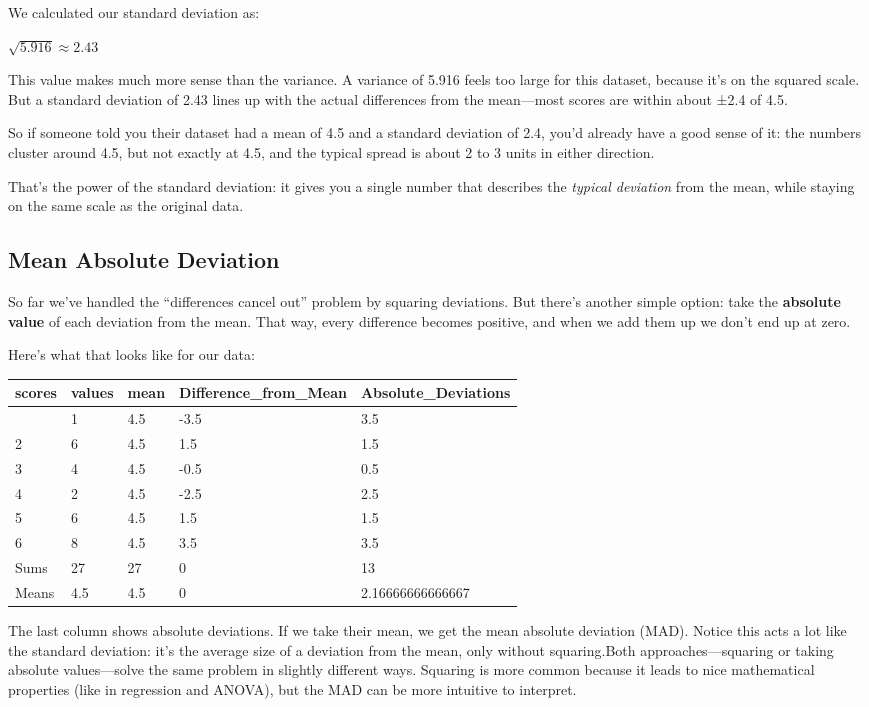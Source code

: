 \documentclass[
  letterpaper,
  DIV=11,
  numbers=noendperiod]{scrreprt}
\begin{document}
We calculated our standard deviation as:

\(\sqrt{5.916} ≈2.43\)

This value makes much more sense than the variance. A variance of 5.916
feels too large for this dataset, because it's on the squared scale. But
a standard deviation of 2.43 lines up with the actual differences from
the mean---most scores are within about ±2.4 of 4.5.

So if someone told you their dataset had a mean of 4.5 and a standard
deviation of 2.4, you'd already have a good sense of it: the numbers
cluster around 4.5, but not exactly at 4.5, and the typical spread is
about 2 to 3 units in either direction.

That's the power of the standard deviation: it gives you a single number
that describes the \emph{typical deviation} from the mean, while staying
on the same scale as the original data.

\subsection{Mean Absolute Deviation}\label{mean-absolute-deviation}

So far we've handled the ``differences cancel out'' problem by squaring
deviations. But there's another simple option: take the \textbf{absolute
value} of each deviation from the mean. That way, every difference
becomes positive, and when we add them up we don't end up at zero.

Here's what that looks like for our data:

\begin{longtable}[]{@{}lllll@{}}
\toprule\noalign{}
scores & values & mean & Difference\_from\_Mean &
Absolute\_Deviations \\
\midrule\noalign{}
\endhead
\bottomrule\noalign{}
\endlastfoot
1 & 1 & 4.5 & -3.5 & 3.5 \\
2 & 6 & 4.5 & 1.5 & 1.5 \\
3 & 4 & 4.5 & -0.5 & 0.5 \\
4 & 2 & 4.5 & -2.5 & 2.5 \\
5 & 6 & 4.5 & 1.5 & 1.5 \\
6 & 8 & 4.5 & 3.5 & 3.5 \\
Sums & 27 & 27 & 0 & 13 \\
Means & 4.5 & 4.5 & 0 & 2.16666666666667 \\
\end{longtable}

The last column shows absolute deviations. If we take their mean, we get
the mean absolute deviation (MAD). Notice this acts a lot like the
standard deviation: it's the average size of a deviation from the mean,
only without squaring.Both approaches---squaring or taking absolute
values---solve the same problem in slightly different ways. Squaring is
more common because it leads to nice mathematical properties (like in
regression and ANOVA), but the MAD can be more intuitive to interpret.
\end{document}
